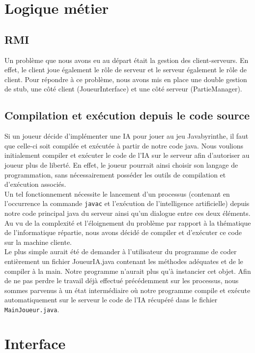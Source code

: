\section{Logique métier}

    \subsection{RMI}
        Un problème que nous avons eu au départ était la gestion des client-serveurs. En effet, le client joue également le rôle de serveur et le serveur également le rôle de client. Pour répondre à ce problème, nous avons mis en place une double gestion de stub, une côté client (JoueurInterface) et une côté serveur (PartieManager).

    \subsection{Compilation et exécution depuis le code source}
	\label{problemes_IA}
	
        Si un joueur décide d'implémenter une IA pour jouer au jeu Javabyrinthe, il faut que celle-ci soit compilée et exécutée à partir de notre code java. Nous voulions initialement compiler et exécuter le code de l'IA sur le serveur afin d'autoriser au joueur plus de liberté. En effet, le joueur pourrait ainsi choisir son langage de programmation, sans nécessairement posséder les outils de compilation et d'exécution associés.\\
		
		Un tel fonctionnement nécessite le lancement d'un processus (contenant en l'occurrence la commande \texttt{javac} et l'exécution de l'intelligence artificielle) depuis notre code principal java du serveur ainsi qu'un dialogue entre ces deux éléments. Au vu de la complexité et l'éloignement du problème par rapport à la thématique de l'informatique répartie, nous avons décidé de compiler et d'exécuter ce code sur la machine cliente.\\
		
		Le plus simple aurait été de demander à l'utilisateur du programme de coder entièrement un fichier JoueurIA.java contenant les méthodes adéquates et de le compiler à la main. Notre programme n'aurait plus qu'à instancier cet objet. Afin de ne pas perdre le travail déjà effectué précédemment sur les processus, nous sommes parvenus à un état intermédiaire où notre programme compile et exécute automatiquement sur le serveur le code de l'IA récupéré dans le fichier \texttt{MainJoueur.java}.


\section{Interface}
